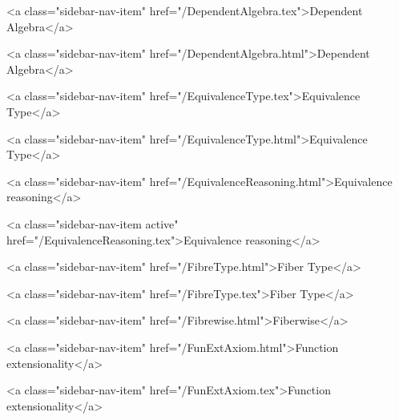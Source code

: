       
    
      
        
          <a class="sidebar-nav-item" href="/DependentAlgebra.tex">Dependent Algebra</a>
        
      
    
      
        
          <a class="sidebar-nav-item" href="/DependentAlgebra.html">Dependent Algebra</a>
        
      
    
      
        
          <a class="sidebar-nav-item" href="/EquivalenceType.tex">Equivalence Type</a>
        
      
    
      
        
          <a class="sidebar-nav-item" href="/EquivalenceType.html">Equivalence Type</a>
        
      
    
      
        
          <a class="sidebar-nav-item" href="/EquivalenceReasoning.html">Equivalence reasoning</a>
        
      
    
      
        
          <a class="sidebar-nav-item active" href="/EquivalenceReasoning.tex">Equivalence reasoning</a>
        
      
    
      
        
          <a class="sidebar-nav-item" href="/FibreType.html">Fiber Type</a>
        
      
    
      
        
          <a class="sidebar-nav-item" href="/FibreType.tex">Fiber Type</a>
        
      
    
      
        
          <a class="sidebar-nav-item" href="/Fibrewise.html">Fiberwise</a>
        
      
    
      
        
          <a class="sidebar-nav-item" href="/FunExtAxiom.html">Function extensionality</a>
        
      
    
      
        
          <a class="sidebar-nav-item" href="/FunExtAxiom.tex">Function extensionality</a>
        
